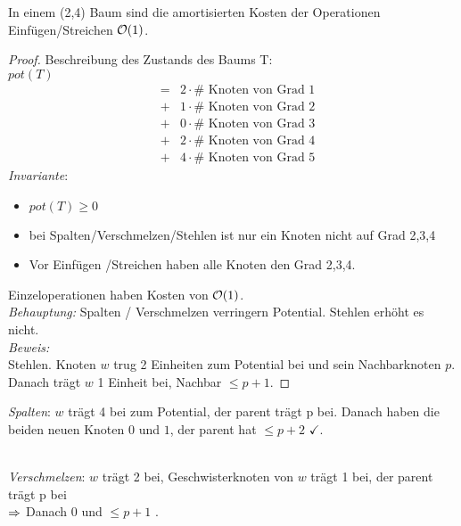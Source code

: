            \begin{lemma}
                In einem (2,4) Baum sind die amortisierten Kosten der Operationen Einfügen/Streichen $\mathcal{O}(1)$.
            \end{lemma}
            \begin{proof}
                Beschreibung des Zustands des Baums T: \\
                $\textit{pot} (T)$
                \begin{eqnarray*}
                    &=& 2 \cdot \# \text{ Knoten von Grad } 1 \\
                    &+& 1 \cdot \# \text{ Knoten von Grad } 2 \\
                    &+& 0 \cdot \# \text{ Knoten von Grad } 3 \\
                    &+& 2 \cdot \# \text{ Knoten von Grad } 4 \\
                    &+& 4 \cdot \# \text{ Knoten von Grad } 5
                \end{eqnarray*}
                \emph{Invariante}: \\
                \begin{itemize}
                    \item $pot(T) \geq 0$ 
                    \item bei Spalten/Verschmelzen/Stehlen ist nur ein Knoten nicht auf Grad 2,3,4
                    \item Vor Einfügen /Streichen haben alle Knoten den Grad 2,3,4.
                \end{itemize}
                Einzeloperationen haben Kosten von $\mathcal{O}(1)$.\\
                \emph{Behauptung:} Spalten / Verschmelzen verringern Potential. Stehlen erhöht es nicht. \\
                \emph{Beweis:} \\
                Stehlen. Knoten $w$ trug 2 Einheiten zum Potential bei und sein Nachbarknoten $p$. Danach trägt $w$ 1 Einheit bei, 
                Nachbar $\leq p +1$.
            \end{proof}

            \emph{Spalten}: $w$ trägt 4 bei zum Potential, der parent trägt p bei. Danach haben die beiden neuen Knoten $0$ und $1$, der
            parent hat $\leq  p +2 $ $\checkmark$.\\\

            \emph{Verschmelzen}: $w$ trägt 2 bei, Geschwisterknoten von $w$ trägt 1 bei, der parent trägt p bei \\
            $\Ra$ Danach 0 und $\leq p+1$ .\\\

